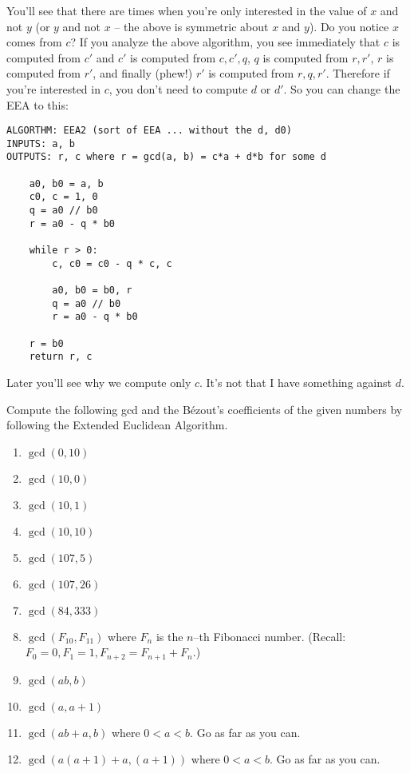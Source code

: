 You'll see that there are times when you're only interested in 
the value of $x$ and not $y$ (or $y$ and not $x$ -- the above is symmetric
about $x$ and $y$).
Do you notice $x$ comes from $c$?
If you analyze the above algorithm, you see immediately that $c$
is computed from $c'$ and $c'$ is computed from $c,c',q$, 
$q$ is computed from $r, r'$, $r$ is computed from $r'$,
and finally (phew!) $r'$ is computed from $r, q, r'$.
Therefore if you're interested in $c$, you don't need to compute $d$ 
or $d'$.
So you can change the EEA to this:



\begin{Verbatim}[frame=single, fontsize=\small]
ALGORTHM: EEA2 (sort of EEA ... without the d, d0)
INPUTS: a, b
OUTPUTS: r, c where r = gcd(a, b) = c*a + d*b for some d

    a0, b0 = a, b
    c0, c = 1, 0
    q = a0 // b0
    r = a0 - q * b0

    while r > 0:   
        c, c0 = c0 - q * c, c
    
        a0, b0 = b0, r
        q = a0 // b0
        r = a0 - q * b0

    r = b0
    return r, c
\end{Verbatim}

Later you'll see why we compute only $c$.
It's not that I have something against $d$.

\newpage
\begin{ex}
  Compute the following gcd and the B\'ezout's coefficients of the
  given numbers by following the Extended Euclidean Algorithm.
  \begin{enumerate}[nosep]
  \item $\gcd(0, 10)$
  \item $\gcd(10, 0)$
  \item $\gcd(10, 1)$
  \item $\gcd(10, 10)$
  \item $\gcd(107, 5)$
  \item $\gcd(107, 26)$
  \item $\gcd(84, 333)$
  \item $\gcd(F_{10}, F_{11})$ where $F_n$ is the $n$--th Fibonacci number.
    (Recall: $F_0 = 0, F_1 = 1, F_{n + 2} = F_{n + 1} + F_n$.)
  \item $\gcd(ab, b)$
  \item $\gcd(a, a + 1)$
  \item $\gcd(ab + a, b)$ where $0 < a < b$. Go as far as you can.
  \item $\gcd(a(a+1) + a, (a+1))$ where $0 < a < b$. Go as far as you can.
  \end{enumerate}
\end{ex}

